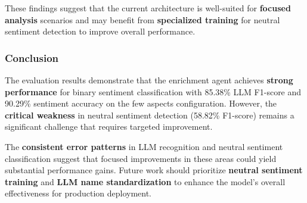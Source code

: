 These findings suggest that the current architecture is well-suited for \textbf{focused analysis} scenarios and may benefit from \textbf{specialized training} for neutral sentiment detection to improve overall performance.

\subsubsection{Conclusion}

The evaluation results demonstrate that the enrichment agent achieves \textbf{strong performance} for binary sentiment classification with 85.38\% LLM F1-score and 90.29\% sentiment accuracy on the few aspects configuration. However, the \textbf{critical weakness} in neutral sentiment detection (58.82\% F1-score) remains a significant challenge that requires targeted improvement.

The \textbf{consistent error patterns} in LLM recognition and neutral sentiment classification suggest that focused improvements in these areas could yield substantial performance gains. Future work should prioritize \textbf{neutral sentiment training} and \textbf{LLM name standardization} to enhance the model's overall effectiveness for production deployment. 